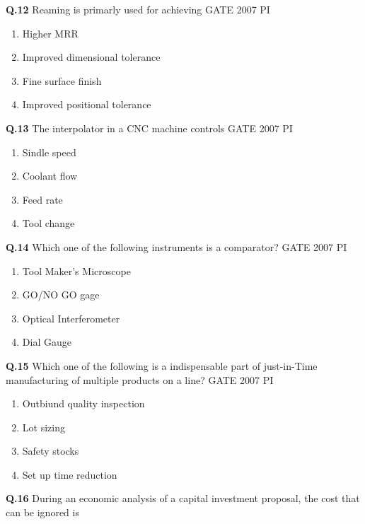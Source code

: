 \documentclass[journal,12pt,onecolumn]{exam}
\theoremstyle{remark}
\begin{document}
        \noindent
        \textbf{Q.12}
        Reaming is primarly used for achieving
        \hfill{GATE 2007 PI}
        \begin{enumerate}
            \item Higher MRR
            \item Improved dimensional tolerance
            \item Fine surface finish
            \item Improved positional tolerance
        \end{enumerate}
        \noindent
        \textbf{Q.13}
        The interpolator in a CNC machine controls
        \hfill{GATE 2007 PI}
        \begin{enumerate}
            \item Sindle speed
            \item Coolant flow
            \item Feed rate
            \item Tool change
        \end{enumerate}
        \noindent
        \textbf{Q.14}
        Which one of the following instruments is a comparator?
        \hfill{GATE 2007 PI}
        \begin{enumerate}
            \item Tool Maker's Microscope
            \item GO/NO GO gage
            \item Optical Interferometer
            \item Dial Gauge
        \end{enumerate}
        \noindent
        \textbf{Q.15}
        Which one of the following is a indispensable part of just-in-Time manufacturing of multiple products on a line?
        \hfill{GATE 2007 PI}
        \begin{enumerate}
            \item Outbiund quality inspection
            \item Lot sizing
            \item Safety stocks
            \item Set up time reduction
        \end{enumerate}
        \noindent
        \textbf{Q.16}
       	During an economic analysis of a capital investment proposal, the cost that can be ignored is
\end{document}

